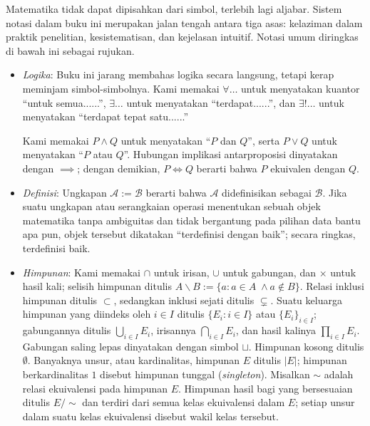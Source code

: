Matematika tidak dapat dipisahkan dari simbol, terlebih lagi aljabar. Sistem notasi dalam buku ini merupakan jalan tengah antara tiga asas: kelaziman dalam praktik penelitian, kesistematisan, dan kejelasan intuitif. Notasi umum diringkas di bawah ini sebagai rujukan.

\begin{itemize}
	\item \emph{Logika}: Buku ini jarang membahas logika secara langsung, tetapi kerap meminjam simbol-simbolnya. Kami memakai $\forall \ldots$ untuk menyatakan kuantor ``untuk semua......'', $\exists \ldots$ untuk menyatakan ``terdapat......'', dan $\exists! \ldots$ untuk menyatakan ``terdapat tepat satu......''
	
	Kami memakai $P \wedge Q$ untuk menyatakan ``$P$ dan $Q$'', serta $P \vee Q$ untuk menyatakan ``$P$ atau $Q$''. Hubungan implikasi antarproposisi dinyatakan dengan $\implies$; dengan demikian, $P \iff Q$ berarti bahwa $P$ ekuivalen dengan $Q$.

	\item \emph{Definisi}: Ungkapan $\mathcal{A} := \mathcal{B}$ berarti bahwa $\mathcal{A}$ didefinisikan sebagai $\mathcal{B}$. Jika suatu ungkapan atau serangkaian operasi menentukan sebuah objek matematika tanpa ambiguitas dan tidak bergantung pada pilihan data bantu apa pun, objek tersebut dikatakan ``terdefinisi dengan baik''; secara ringkas, terdefinisi baik. 

	\item \emph{Himpunan}: Kami memakai $\cap$ untuk irisan, $\cup$ untuk gabungan, dan $\times$ untuk hasil kali; selisih himpunan ditulis $A \smallsetminus B := \{a: a \in A \; \wedge a \notin B \}$. Relasi inklusi himpunan ditulis $\subset$, sedangkan inklusi sejati ditulis $\subsetneq$. Suatu keluarga himpunan yang diindeks oleh $i \in I$ ditulis $\{E_i : i \in I\}$ atau $\{E_i \}_{i \in I}$; gabungannya ditulis $\bigcup_{i \in I} E_i$, irisannya $\bigcap_{i \in I} E_i$, dan hasil kalinya $\prod_{i \in I} E_i$. Gabungan saling lepas dinyatakan dengan simbol $\sqcup$. Himpunan kosong ditulis $\emptyset$. Banyaknya unsur, atau kardinalitas, himpunan $E$ ditulis $|E|$; himpunan berkardinalitas $1$ disebut himpunan tunggal (\emph{singleton}). Misalkan $\sim$ adalah relasi ekuivalensi pada himpunan $E$. Himpunan hasil bagi yang bersesuaian ditulis $E/\sim$ dan terdiri dari semua kelas ekuivalensi dalam $E$; setiap unsur dalam suatu kelas ekuivalensi disebut wakil kelas tersebut.
	

\end{itemize}
